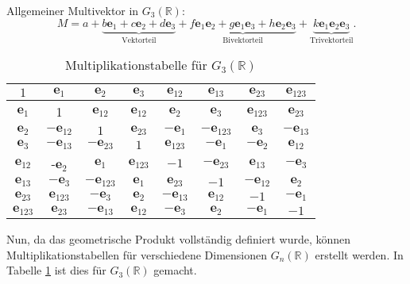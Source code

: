 %
%
\begin{beispiel}
Allgemeiner Multivektor in $G_3(\mathbb{R})$:
\begin{equation*}
    M = a 
    + 
    \underbrace{b\textbf{e}_1 + c\textbf{e}_2 + d\textbf{e}_3}_{\text{Vektorteil}} 
    +
    \underbrace{f\textbf{e}_1\textbf{e}_2 + g\textbf{e}_1\textbf{e}_3 + h\textbf{e}_2\textbf{e}_3 }_{\text{Bivektorteil}} 
    +   
    \underbrace{k\textbf{e}_1\textbf{e}_2\textbf{e}_3}_{\text{Trivektorteil}}.
\end{equation*}
\end{beispiel}
\begin{table}
    \begin{center}
    \begin{tabular}{ |c|ccc|ccc|c| } 
     \hline
     $1$ & $\textbf{e}_1$ & $\textbf{e}_2$ &$\textbf{e}_3$ & $\textbf{e}_{12}$ & $\textbf{e}_{13}$ & $\textbf{e}_{23}$ & $\textbf{e}_{123}$\\
     \hline
     $\textbf{e}_1$ & 1 & $\textbf{e}_{12}$ & $\textbf{e}_{12}$ & $\textbf{e}_2$ & $\textbf{e}_3$ & $\textbf{e}_{123}$ & $\textbf{e}_{23}$\\
     $\textbf{e}_2$ & $-\textbf{e}_{12}$ & $1$ & $\textbf{e}_{23}$ & $-\textbf{e}_1$ & $-\textbf{e}_{123}$ & $\textbf{e}_3$ & $-\textbf{e}_{13}$\\
     $\textbf{e}_3$ & $-\textbf{e}_{13}$ & $-\textbf{e}_{23}$ & $1$ & $\textbf{e}_{123}$ & $-\textbf{e}_1$ & $-\textbf{e}_2$ & $\textbf{e}_{12}$\\
     \hline
     $\textbf{e}_{12}$ & -$\textbf{e}_2$ & $\textbf{e}_1$& $\textbf{e}_{123}$ & $-1$ & $-\textbf{e}_{23}$ & $\textbf{e}_{13}$ &  $-\textbf{e}_{3}$\\
     $\textbf{e}_{13}$ & $-\textbf{e}_{3}$ & $-\textbf{e}_{123}$ & $\textbf{e}_{1}$ & $\textbf{e}_{23}$ & $-1$ & $-\textbf{e}_{12}$ &  $\textbf{e}_{2}$\\
     $\textbf{e}_{23}$ &  $\textbf{e}_{123}$ & $-\textbf{e}_{3}$ & $\textbf{e}_{2}$ & $-\textbf{e}_{13}$ & $\textbf{e}_{12}$ & $-1$ & $-\textbf{e}_{1}$ \\
     \hline
     $\textbf{e}_{123}$ & $\textbf{e}_{23}$ & $-\textbf{e}_{13}$ & $\textbf{e}_{12}$ & $-\textbf{e}_{3}$& $\textbf{e}_{2}$ & $-\textbf{e}_{1}$ & $-1$ \\
     \hline
    \end{tabular}
    \end{center}
 	\caption{Multiplikationstabelle für $G_3(\mathbb{R})$
    \label{tab:multip}}
\end{table}
Nun, da das geometrische Produkt vollständig definiert wurde, können Multiplikationstabellen für verschiedene Dimensionen $G_n(\mathbb{R})$ erstellt werden. In Tabelle \ref{tab:multip} ist dies für  $G_3(\mathbb{R})$ gemacht.
